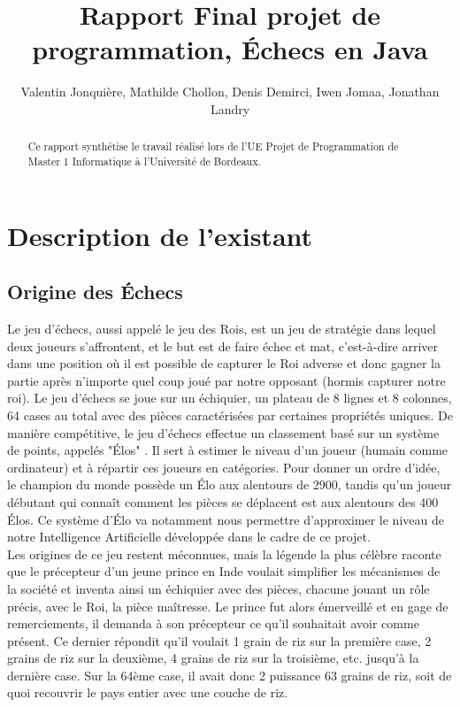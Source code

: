 \documentclass{article}
\author{
    Valentin Jonquière,
    Mathilde Chollon,
    Denis Demirci,
    Iwen Jomaa,
    Jonathan Landry
}
\title{Rapport Final projet de programmation, Échecs en Java}
\begin{document}
\maketitle

\pagebreak

\tableofcontents

\pagebreak
\begin{abstract}
    Ce rapport synthétise le travail réalisé lors de l'UE Projet de Programmation de Master 1 Informatique à l'Université de Bordeaux.
 \end{abstract}

\section{Description de l'existant}
\subsection{Origine des Échecs}
Le jeu d’échecs, aussi appelé le jeu des Rois, est un jeu de stratégie dans lequel deux joueurs s’affrontent,
et le but est de faire échec et mat, c’est-à-dire arriver dans une position où il est possible de capturer
le Roi adverse et donc gagner la partie après n’importe quel coup joué par notre opposant (hormis capturer notre roi).
Le jeu d’échecs se joue sur un échiquier, un plateau de 8 lignes et 8 colonnes, 64 cases au total avec des pièces
caractérisées par certaines propriétés uniques. De manière compétitive, le jeu d'échecs effectue un classement
basé sur un système de points, appelés "Élos" \cite{elo}. Il sert à estimer le niveau d'un joueur (humain comme ordinateur) et
à répartir ces joueurs en catégories. Pour donner un ordre d'idée, le champion du monde possède un Élo aux alentours de 2900,
tandis qu'un joueur débutant qui connaît comment les pièces se déplacent est aux alentours des 400 Élos. Ce système d'Élo
va notamment nous permettre d'approximer le niveau de notre Intelligence Artificielle développée dans le cadre de ce projet.\\
Les origines de ce jeu restent méconnues, mais la légende la plus célèbre raconte que le précepteur d’un jeune prince en Inde
voulait simplifier les mécanismes de la société et inventa ainsi un échiquier avec des pièces, chacune jouant un rôle précis,
avec le Roi, la pièce maîtresse. Le prince fut alors émerveillé et en gage de remerciements, il demanda à son précepteur ce
qu’il souhaitait avoir comme présent. Ce dernier répondit qu’il voulait 1 grain de riz sur la première case, 2 grains de riz
sur la deuxième, 4 grains de riz sur la troisième, etc. jusqu’à la dernière case. Sur la 64ème case, il avait donc
2 puissance 63 grains de riz, soit de quoi recouvrir le pays entier avec une couche de riz.
\end{document}
